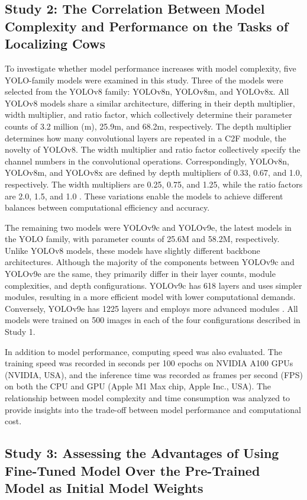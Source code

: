 \subsection*{Study 2: The Correlation Between Model Complexity and Performance on the Tasks of Localizing Cows}

To investigate whether model performance increases with model complexity, five YOLO-family models were examined in this study. Three of the models were selected from the YOLOv8 family: YOLOv8n, YOLOv8m, and YOLOv8x. All YOLOv8 models share a similar architecture, differing in their depth multiplier, width multiplier, and ratio factor, which collectively determine their parameter counts of 3.2 million (m), 25.9m, and 68.2m, respectively. The depth multiplier determines how many convolutional layers are repeated in a C2F module, the novelty of YOLOv8. The width multiplier and ratio factor collectively specify the channel numbers in the convolutional operations. Correspondingly, YOLOv8n, YOLOv8m, and YOLOv8x are defined by depth multipliers of 0.33, 0.67, and 1.0, respectively. The width multipliers are 0.25, 0.75, and 1.25, while the ratio factors are 2.0, 1.5, and 1.0 \cite{v8yaml}. These variations enable the models to achieve different balances between computational efficiency and accuracy.

The remaining two models were YOLOv9c and YOLOv9e, the latest models in the YOLO family, with parameter counts of 25.6M and 58.2M, respectively. Unlike YOLOv8 models, these models have slightly different backbone architectures. Although the majority of the components between YOLOv9c and YOLOv9e are the same, they primarily differ in their layer counts, module complexities, and depth configurations. YOLOv9c has 618 layers and uses simpler modules, resulting in a more efficient model with lower computational demands. Conversely, YOLOv9e has 1225 layers and employs more advanced modules \cite{v9yaml}. All models were trained on 500 images in each of the four configurations described in Study 1.

In addition to model performance, computing speed was also evaluated. The training speed was recorded in seconds per 100 epochs on NVIDIA A100 GPUs (NVIDIA, USA), and the inference time was recorded as frames per second (FPS) on both the CPU and GPU (Apple M1 Max chip, Apple Inc., USA). The relationship between model complexity and time consumption was analyzed to provide insights into the trade-off between model performance and computational cost.

\subsection*{Study 3: Assessing the Advantages of Using Fine-Tuned Model Over the Pre-Trained Model as Initial Model Weights}


